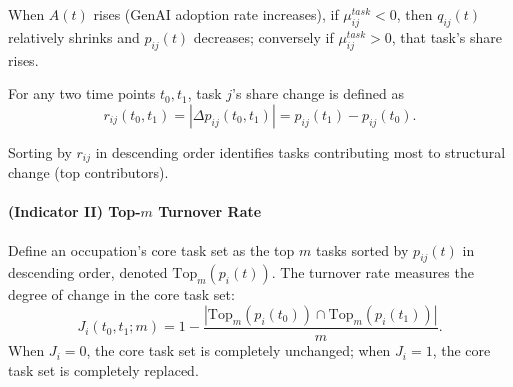 When $A(t)$ rises (GenAI adoption rate increases), if $\mu^{task}_{ij}<0$, then $q_{ij}(t)$ relatively shrinks and $p_{ij}(t)$ decreases; conversely if $\mu^{task}_{ij}>0$, that task's share rises.

For any two time points $t_0,t_1$, task $j$'s share change is defined as
\begin{equation}
\label{eq:delta_p}
r_{ij}(t_0,t_1)=\left|\Delta p_{ij}(t_0,t_1)\right|=p_{ij}(t_1)-p_{ij}(t_0).
\end{equation}

Sorting by $r_{ij}$ in descending order identifies tasks contributing most to structural change (top contributors).
\paragraph{(Indicator II) Top-$m$ Turnover Rate}

Define an occupation's core task set as the top $m$ tasks sorted by $p_{ij}(t)$ in descending order, denoted $\mathrm{Top}_m(p_i(t))$. The turnover rate measures the degree of change in the core task set:
\begin{equation}
\label{eq:turnover}
J_i(t_0,t_1;m)=1-\frac{\left|\mathrm{Top}_m(p_i(t_0))\cap \mathrm{Top}_m(p_i(t_1))\right|}{m}.
\end{equation}
When $J_i=0$, the core task set is completely unchanged; when $J_i=1$, the core task set is completely replaced.


